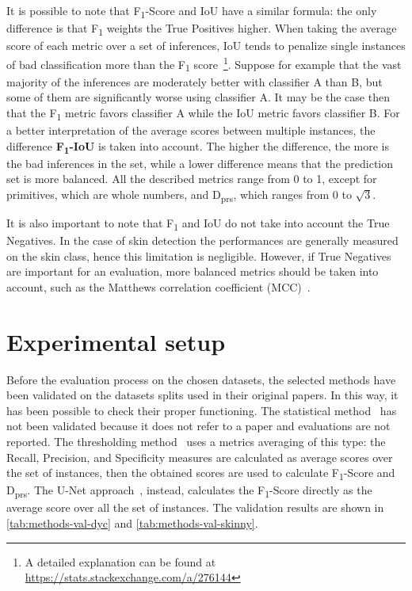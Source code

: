 \noindent It is possible to note that F\textsubscript{1}-Score and IoU have a similar formula: the only difference is that  F\textsubscript{1} weights the True Positives higher.
When taking the average score of each metric over a set of inferences, IoU tends to penalize single instances of bad classification more than the F\textsubscript{1} score~\footnote{A detailed explanation can be found at \url{https://stats.stackexchange.com/a/276144}}.
Suppose for example that the vast majority of the inferences are moderately better with classifier A than B, but some of them are significantly worse using classifier A. It may be the case then that the F\textsubscript{1} metric favors classifier A while the IoU metric favors classifier B.
For a better interpretation of the average scores between multiple instances, the difference \textbf{F\textsubscript{1}-IoU} is taken into account.
The higher the difference, the more is the bad inferences in the set, while a lower difference means that the prediction set is more balanced.
All the described metrics range from 0 to 1, except for primitives, which are whole numbers, and D\textsubscript{prs}, which ranges from 0 to $\sqrt{3}$.

\noindent It is also important to note that F\textsubscript{1} and IoU do not take into account the True Negatives. In the case of skin detection the performances are generally measured on the skin class, hence this limitation is negligible. However, if True Negatives are important for an evaluation, more balanced metrics should be taken into account, such as the Matthews correlation coefficient (MCC)~\cite{chicco2020advantages}.


\section{Experimental setup}

Before the evaluation process on the chosen datasets, the selected methods have been validated on the datasets splits used in their original papers.
In this way, it has been possible to check their proper functioning.
The statistical method~\cite{acharjee2018skin} has not been validated because it does not refer to a paper and evaluations are not reported.
The thresholding method~\cite{brancati2017human} uses a metrics averaging of this type: the Recall, Precision, and Specificity measures are calculated as average scores over the set of instances, then the obtained scores are used to calculate F\textsubscript{1}-Score and D\textsubscript{prs}.
The U-Net approach~\cite{tarasiewicz2020skinny}, instead, calculates the F\textsubscript{1}-Score directly as the average score over all the set of instances.
The validation results are shown in \autoref{tab:methods-val-dyc}
and \autoref{tab:methods-val-skinny}.

